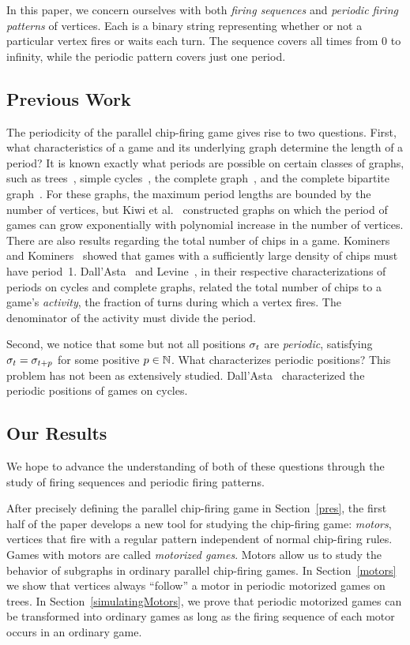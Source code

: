 In this paper, we concern ourselves with both \emph{firing sequences} and
\emph{periodic firing patterns} of vertices. Each is a binary string
representing whether or not a particular vertex fires or waits each turn. The
sequence covers all times from 0 to infinity, while the periodic pattern covers
just one period.

\subsection*{Previous Work}
The periodicity of the parallel chip-firing game gives rise to two
questions. First, what characteristics of a game and its underlying graph
determine the length of a period? It is known exactly what periods are possible
on certain classes of graphs, such as trees~\cite{bitarGoles}, simple
cycles~\cite{cycle}, the complete graph~\cite{levine}, and the complete
bipartite graph~\cite{jiang}. For these graphs, the maximum period lengths are
bounded by the number of vertices, but Kiwi et al.~\cite{kiwiEtAl} constructed
graphs on which the period of games can grow exponentially with polynomial
increase in the number of vertices. There are also results regarding the total
number of chips in a game. Kominers and Kominers~\cite{kominers} showed that
games with a sufficiently large density of chips must have
period~1. Dall'Asta~\cite{cycle} and Levine~\cite{levine}, in their respective
characterizations of periods on cycles and complete graphs, related the total
number of chips to a game's \emph{activity}, the fraction of turns during which
a vertex fires. The denominator of the activity must divide the period.

Second, we notice that some but not all positions $\sigma_{t}$ are
\emph{periodic}, satisfying $\sigma_{t} = \sigma_{t+p}$ for some positive $p \in
\mathbb{N}$. What characterizes periodic positions? This problem has not been as
extensively studied. Dall'Asta~\cite{cycle} characterized the periodic
positions of games on cycles.

\subsection*{Our Results}
We hope to advance the understanding of both of these questions through the
study of firing sequences and periodic firing patterns.

After precisely defining the parallel chip-firing game in Section~\ref{pres},
the first half of the paper develops a new tool for studying the chip-firing
game: \emph{motors}, vertices that fire with a regular pattern independent of
normal chip-firing rules. Games with motors are called \emph{motorized
  games}. Motors allow us to study the behavior of subgraphs in ordinary
parallel chip-firing games. In Section~\ref{motors} we show that vertices
always ``follow'' a motor in periodic motorized games on trees. In
Section~\ref{simulatingMotors}, we prove that periodic motorized games can be
transformed into ordinary games as long as the firing sequence of each motor
occurs in an ordinary game.

